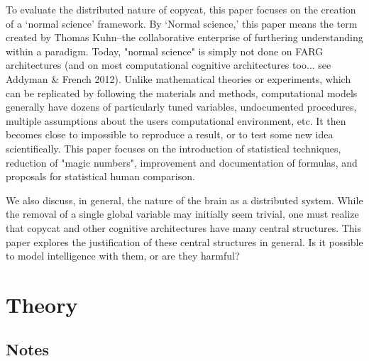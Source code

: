 \documentclass[a4paper]{article}
\begin{document}
    To evaluate the distributed nature of copycat, this paper focuses on the creation of a `normal science' framework.
    By `Normal science,' this paper means the term created by Thomas Kuhn--the collaborative enterprise of furthering understanding within a paradigm. 
    Today, "normal science" is simply not done on FARG architectures (and on most computational cognitive architectures too... see Addyman \& French 2012). 
    Unlike mathematical theories or experiments, which can be replicated by following the materials and methods, computational models generally have dozens of particularly tuned variables, undocumented procedures, multiple assumptions about the users computational environment, etc.
    It then becomes close to impossible to reproduce a result, or to test some new idea scientifically. 
    This paper focuses on the introduction of statistical techniques, reduction of "magic numbers", improvement and documentation of formulas, and proposals for statistical human comparison.

    We also discuss, in general, the nature of the brain as a distributed system.
    While the removal of a single global variable may initially seem trivial, one must realize that copycat and other cognitive architectures have many central structures.
    This paper explores the justification of these central structures in general.
    Is it possible to model intelligence with them, or are they harmful?

\section{Theory}
    \subsection{Notes}
\end{document}
